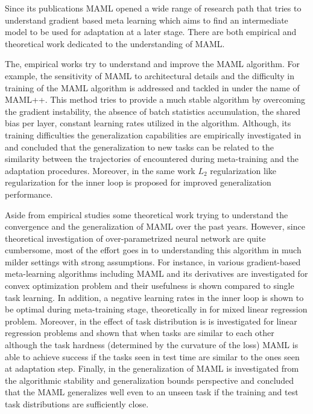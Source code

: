 
Since its publications MAML \cite{Finn2017} opened a wide range of research path that tries to understand gradient based meta learning which aims to find an intermediate model to be used for adaptation at a later stage. There are both empirical and theoretical work dedicated to the understanding of MAML.

The, empirical works try to understand and improve the MAML algorithm. For example, the sensitivity of MAML to architectural details and the difficulty in training of the MAML algorithm is addressed and tackled in \cite{Antoniou2019} under the name of MAML++. This method tries to provide a much stable algorithm by overcoming the gradient instability, the absence of batch statistics accumulation, the shared bias per layer, constant learning rates utilized in the algorithm. Although, its training difficulties the generalization capabilities are empirically investigated in \cite{Guiroy2019a} and concluded that the generalization to new tasks can be related to the similarity between the trajectories of encountered during meta-training and the adaptation procedures. Moreover, in the same work $L_2$ regularization like regularization for the inner loop is proposed for improved generalization performance. 

Aside from empirical studies some theoretical work trying to understand the convergence and the generalization of MAML over the past years. However, since theoretical investigation of over-parametrized neural network are quite cumbersome, most of the effort goes in to understanding this algorithm in much milder settings with strong assumptions. For instance, in \cite{Khodak2019} various gradient-based meta-learning algorithms including MAML and its derivatives are investigated for convex optimization problem and their usefulness is shown compared to single task learning. In addition, a negative learning rates in the inner loop is shown to be optimal during meta-training stage, theoretically in \cite{Bernacchia2021} for mixed linear regression problem. Moreover, in \cite{Collins2020b} the effect of task distribution is is investigated for linear regression problems and shown that when tasks are similar to each other although the task hardness (determined by the curvature of the loss) MAML is able to achieve success if the tasks seen in test time are similar to the ones seen at adaptation step. Finally, in \cite{Fallah2021} the generalization of MAML is investigated from the algorithmic stability and generalization bounds perspective and concluded that the MAML generalizes well even to an unseen task if the training and test task distributions are sufficiently close. 


